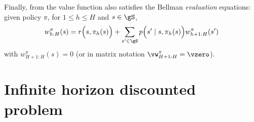 

Finally, from \cite[Chapter~4]{puterman2014markov} the value function also satisfies the Bellman \emph{evaluation} equations: given policy $\pi$, for $1\le h\le H$ and $s\in\gS$,
\begin{equation}
    \label{eq:finite_be_eval2}
    w_{h:H}^\pi(s) = \displaystyle r\Big(s, \pi_h(s)\Big) +\sum_{s'\in\gS}p\Bigl(s' \mid s, \pi_h(s)\Bigr)w_{h+1:H}^\pi(s')
\end{equation}
with $w_{H+1:H}^\pi(s)=0$ (or in matrix notation $\vw_{H+1:H}^\pi=\vzero$).
%

\section{Infinite horizon discounted problem}
\label{ch:mdp:sec:discounted}

